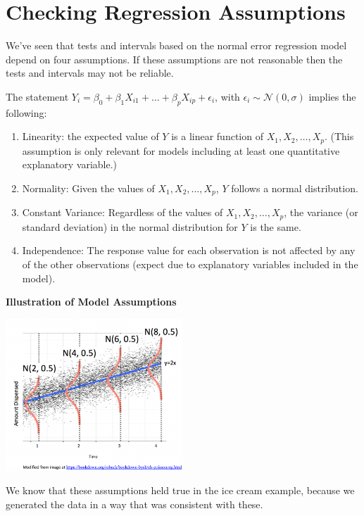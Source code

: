\documentclass[
  letterpaper,
  DIV=11,
  numbers=noendperiod]{scrreprt}
\begin{document}
\section{Checking Regression
Assumptions}\label{checking-regression-assumptions}

We've seen that tests and intervals based on the normal error regression
model depend on four assumptions. If these assumptions are not
reasonable then the tests and intervals may not be reliable.

The statement
\(Y_i = \beta_0 + \beta_1X_{i1}+ \ldots + \beta_pX_{ip} + \epsilon_i\),
with \(\epsilon_i\sim\mathcal{N}(0,\sigma)\) implies the following:

\begin{enumerate}
\def\labelenumi{\arabic{enumi}.}
\item
  Linearity: the expected value of \(Y\) is a linear function of
  \(X_1, X_2, \ldots, X_p\). (This assumption is only relevant for
  models including at least one quantitative explanatory variable.)
\item
  Normality: Given the values of \(X_1, X_2, \ldots, X_p\), \(Y\)
  follows a normal distribution.
\item
  Constant Variance: Regardless of the values of
  \(X_1, X_2, \ldots, X_p\), the variance (or standard deviation) in the
  normal distribution for \(Y\) is the same.
\item
  Independence: The response value for each observation is not affected
  by any of the other observations (expect due to explanatory variables
  included in the model).
\end{enumerate}

\textbf{Illustration of Model Assumptions}

\includegraphics[width=0.5\textwidth,height=\textheight]{SLR_Model_Assumptions.png}

We know that these assumptions held true in the ice cream example,
because we generated the data in a way that was consistent with these.
\end{document}
